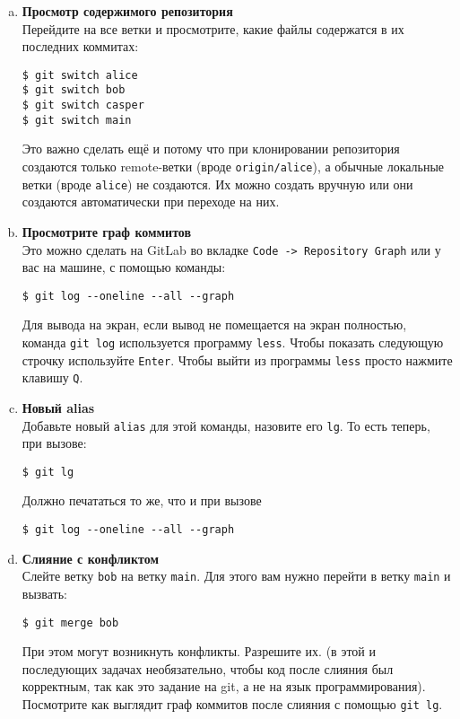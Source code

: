 \documentclass{article}
\begin{document}
\begin{enumerate}[a.]

\item \textbf{Просмотр содержимого репозитория}\\
Перейдите на все ветки и просмотрите, какие файлы содержатся в их последних коммитах:
\begin{lstlisting}
$ git switch alice
$ git switch bob
$ git switch casper
$ git switch main
\end{lstlisting}
Это важно сделать ещё и потому что при клонировании репозитория создаются только remote-ветки (вроде \texttt{origin/alice}), а обычные локальные ветки (вроде  \texttt{alice}) не создаются. Их можно создать вручную или они создаются автоматически при переходе на них.

\item \textbf{Просмотрите граф коммитов}\\
Это можно сделать на GitLab во вкладке \texttt{Code -> Repository Graph} или у вас на машине, с помощью команды:
\begin{lstlisting}
$ git log --oneline --all --graph
\end{lstlisting}
Для вывода на экран, если вывод не помещается на экран полностью, команда \texttt{git log} используется программу \texttt{less}. Чтобы показать следующую строчку используйте \texttt{Enter}. Чтобы выйти из программы \texttt{less} просто нажмите клавишу \texttt{Q}.

\iffalse
В этом выводе будут отображаться как обычные ветки (вроде \texttt{alice}), так и удалённые ветки (вроде \texttt{origin/alice}). Чтобы удалённые ветки не отображались будем использовать следующую команду:
\begin{lstlisting}
$ git log --oneline --all --graph --decorate-refs-exclude=refs/remotes/*
\end{lstlisting}
\fi

\item \textbf{Новый alias}\\
Добавьте новый \texttt{alias} для этой команды, назовите его \texttt{lg}. То есть теперь, при вызове: 
\begin{lstlisting}
$ git lg
\end{lstlisting}
Должно печататься то же, что и при вызове 
\begin{lstlisting}
$ git log --oneline --all --graph
\end{lstlisting}



\item \textbf{Слияние с конфликтом}\\
Слейте ветку \texttt{bob} на ветку \texttt{main}. Для этого вам нужно перейти в ветку \texttt{main} и вызвать:
\begin{lstlisting}
$ git merge bob
\end{lstlisting}
При этом могут возникнуть конфликты. Разрешите их. (в этой и последующих задачах необязательно, чтобы код после слияния был корректным, так как это задание на git, а не на язык программирования). Посмотрите как выглядит граф коммитов после слияния с помощью \texttt{git lg}.


\end{enumerate}
\end{document}
